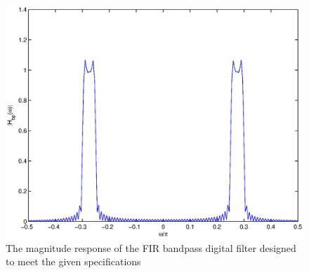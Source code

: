 \documentclass{article}
\begin{document}
\begin{figure}
\includegraphics[width = \columnwidth]{filtdesign/writeup/figs/fig6.eps}
\caption{The magnitude response of the FIR bandpass digital filter designed to meet the given specifications} 
	\label{filtdesign/writeup/figs/fig6}
\end{figure}


\end{document}
